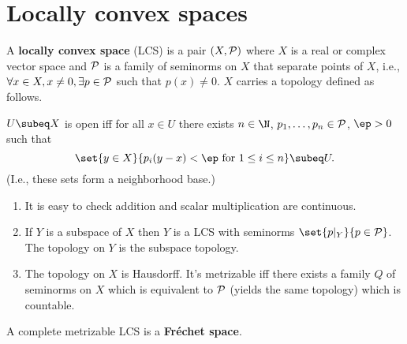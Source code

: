 \section{Locally convex spaces}
\begin{df}
A \textbf{locally convex space} (LCS) is a pair $(X,\cal P)$ where $X$ is a real or complex vector space and $\cal P$ is a family of seminorms on $X$ that separate points of $X$, i.e., $\forall x\in X,x\ne 0,\exists p\in \cal P$ such that $p(x)\ne 0$. $X$ carries a topology defined as follows.

$U\subeq X$ is open iff for all $x\in U$ there exists $n\in \N$, $p_1,\ldots, p_n\in \cal P$, $\ep>0$ such that
\[
\set{y\in X}{p_i(y-x)<\ep\text{ for }1\le i\le n}\subeq U.
\]
(I.e., these sets form a neighborhood base.)
\end{df}
\begin{rem}
\begin{enumerate}
\item
It is easy to check addition and scalar multiplication are continuous.
\item If $Y$ is a subspace of $X$ then $Y$ is a LCS with seminorms $\set{p|_Y}{p\in \cal P}$. The topology on $Y$ is the subspace topology. 
\item
The topology on $X$ is Hausdorff. It's metrizable iff there exists a family $Q$ of seminorms on $X$ which is equivalent to $\cal P$ (yields the same topology) which is countable. 
\end{enumerate}
\end{rem}
\begin{df}
A complete metrizable LCS is a \textbf{Fr\'echet space}.
\end{df}
